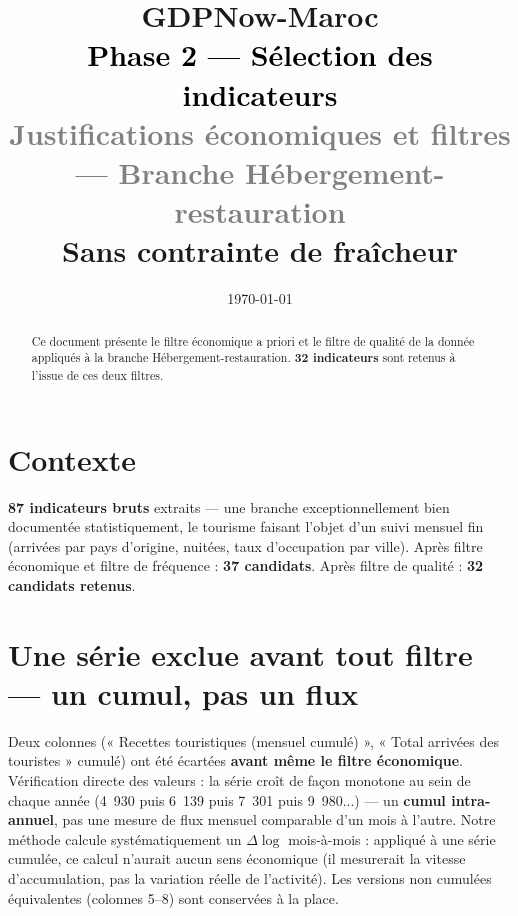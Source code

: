 \documentclass[11pt,a4paper]{article}
\title{\vspace{-1.3cm}\textcolor{bleuprincip}{\Huge\bfseries GDPNow-Maroc}\\[0.3cm]
\textcolor{black}{\Large Phase 2 --- Sélection des indicateurs}\\[0.15cm]
\textcolor{gray}{\large Justifications économiques et filtres --- Branche Hébergement-restauration}\\[0.1cm]
\textcolor{orangealerte}{\normalsize Sans contrainte de fraîcheur}}
\author{}
\date{\today}
\begin{document}
\maketitle
\thispagestyle{empty}

\begin{abstract}
\noindent Ce document présente le filtre économique a priori et le filtre de qualité de la donnée appliqués à la branche Hébergement-restauration. \textbf{32 indicateurs} sont retenus à l'issue de ces deux filtres.
\end{abstract}

\tableofcontents
\vspace{0.3cm}

\section{Contexte}

\begin{fichebox}
\textbf{87 indicateurs bruts} extraits --- une branche exceptionnellement bien documentée statistiquement, le tourisme faisant l'objet d'un suivi mensuel fin (arrivées par pays d'origine, nuitées, taux d'occupation par ville). Après filtre économique et filtre de fréquence : \textbf{37 candidats}. Après filtre de qualité : \textbf{32 candidats retenus}.
\end{fichebox}

\section{Une série exclue avant tout filtre --- un cumul, pas un flux}

\begin{alertebox}
Deux colonnes (« Recettes touristiques (mensuel cumulé) », « Total arrivées des touristes » cumulé) ont été écartées \textbf{avant même le filtre économique}. Vérification directe des valeurs : la série croît de façon monotone au sein de chaque année (4~930 puis 6~139 puis 7~301 puis 9~980...) --- un \textbf{cumul intra-annuel}, pas une mesure de flux mensuel comparable d'un mois à l'autre. Notre méthode calcule systématiquement un $\Delta\log$ mois-à-mois : appliqué à une série cumulée, ce calcul n'aurait aucun sens économique (il mesurerait la vitesse d'accumulation, pas la variation réelle de l'activité). Les versions non cumulées équivalentes (colonnes 5--8) sont conservées à la place.
\end{alertebox}
\end{document}
